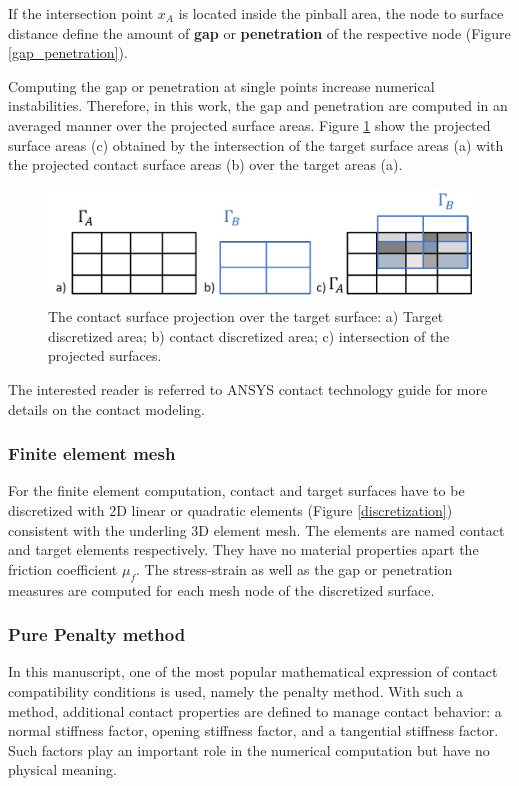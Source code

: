 If the intersection point $x_A$ is located inside the pinball area, the node to surface distance define the amount of \textbf{gap} or \textbf{penetration} of the respective node (Figure \ref{gap_penetration}).
 
Computing the gap or penetration at single points increase numerical instabilities.  Therefore, in this work, the gap and penetration are computed in an averaged manner over the projected surface areas. Figure \ref{projecte_surface} show the projected surface areas (c) obtained by the intersection of the target surface areas (a) with the projected contact surface areas (b) over the target areas (a). 


\begin{figure}[!h]
\centering
\includegraphics[width=1\textwidth,keepaspectratio]{figures/projecte_surface.jpg} 
\caption{The contact surface projection over the target surface: a) Target discretized area; b) contact discretized area; c) intersection of the projected surfaces.}
\label{projecte_surface}
\end{figure}


 The interested reader is referred to ANSYS contact technology guide \citep{ansys_contact_2017} for more details on the contact modeling.


\subsubsection*{Finite element mesh}
For the finite element computation, contact and target surfaces have to be discretized with 2D linear or quadratic elements (Figure \ref{discretization}) consistent with the underling 3D element mesh. The elements are named contact and target elements respectively.  They have no material properties apart the friction coefficient $\mu_f$. The stress-strain as well as the gap or penetration measures are computed for each mesh node of the discretized surface.

\subsubsection*{Pure Penalty method}
In this manuscript, one of the most popular mathematical expression of contact compatibility conditions is used, namely the penalty method. With such a method, additional contact properties are defined to manage contact behavior: a normal stiffness factor, opening stiffness factor, and a tangential stiffness factor. Such factors play an important role in the numerical computation but have no physical meaning.

